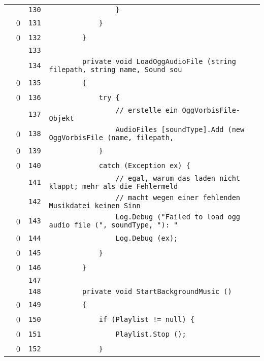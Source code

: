 \documentclass[a4paper,10pt]{article}
\begin{document}
\begin{longtable}[l]{lrrl}
\cellcolor{gray} &  & \verb~130~ & \verb~                }~\\
\cellcolor{red} & 0 & \verb~131~ & \verb~            }~\\
\cellcolor{red} & 0 & \verb~132~ & \verb~        }~\\
\cellcolor{gray} &  & \verb~133~ & \verb~~\\
\cellcolor{gray} &  & \verb~134~ & \verb~        private void LoadOggAudioFile (string filepath, string name, Sound sou~\\
\cellcolor{red} & 0 & \verb~135~ & \verb~        {~\\
\cellcolor{red} & 0 & \verb~136~ & \verb~            try {~\\
\cellcolor{gray} &  & \verb~137~ & \verb~                // erstelle ein OggVorbisFile-Objekt~\\
\cellcolor{red} & 0 & \verb~138~ & \verb~                AudioFiles [soundType].Add (new OggVorbisFile (name, filepath,~\\
\cellcolor{red} & 0 & \verb~139~ & \verb~            }~\\
\cellcolor{red} & 0 & \verb~140~ & \verb~            catch (Exception ex) {~\\
\cellcolor{gray} &  & \verb~141~ & \verb~                // egal, warum das laden nicht klappt; mehr als die Fehlermeld~\\
\cellcolor{gray} &  & \verb~142~ & \verb~                // macht wegen einer fehlenden Musikdatei keinen Sinn~\\
\cellcolor{red} & 0 & \verb~143~ & \verb~                Log.Debug ("Failed to load ogg audio file (", soundType, "): "~\\
\cellcolor{red} & 0 & \verb~144~ & \verb~                Log.Debug (ex);~\\
\cellcolor{red} & 0 & \verb~145~ & \verb~            }~\\
\cellcolor{red} & 0 & \verb~146~ & \verb~        }~\\
\cellcolor{gray} &  & \verb~147~ & \verb~~\\
\cellcolor{gray} &  & \verb~148~ & \verb~        private void StartBackgroundMusic ()~\\
\cellcolor{red} & 0 & \verb~149~ & \verb~        {~\\
\cellcolor{red} & 0 & \verb~150~ & \verb~            if (Playlist != null) {~\\
\cellcolor{red} & 0 & \verb~151~ & \verb~                Playlist.Stop ();~\\
\cellcolor{red} & 0 & \verb~152~ & \verb~            }~\\

\end{longtable}
\end{document}
